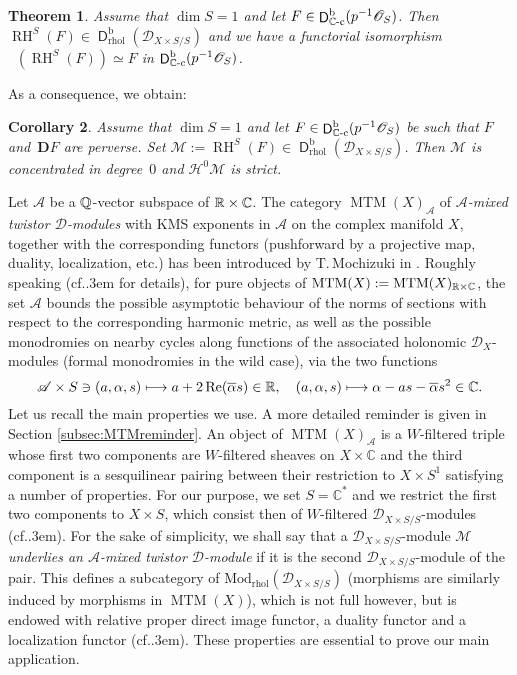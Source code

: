 \documentclass[english]{smfart}
\numberwithin{subsection}{section}
\def\sha{\mathcal{A}}\let\cA\sha
\def\shd{\mathcal{D}}\let\cD\shd
\def\shh{\mathcal{H}}
\def\shh{\mathcal{H}}
\def\shm{\mathcal{M}}
\def\sho{\mathcal{O}}\let\cO\sho
\newcommand{\C}{\mathbb{C}}\let\CC\C
\newcommand{\bD}{\boldsymbol{D}}
\DeclareMathOperator{\RH}{RH}
\newcommand{\rb}{\mathrm{b}}
\newcommand{\rhol}{\mathrm{rhol}}
\newcommand{\Mod}{\mathrm{Mod}}
\newcommand{\cc}{{\C\textup{-c}}}
\newcommand{\XS}{X\times S}
\newcommand{\DXS}{\shd_{\XS/S}}
\DeclareMathOperator{\rD}{\mathsf{D}}
\DeclareMathOperator{\MTM}{MTM}
\DeclareMathOperator{\reel}{Re}
\DeclareMathOperator{\pSol}{{}^\mathrm{p}Sol}
\let\ov\overline
\def\cf{cf.\kern.3em}
\newcommand{\pOS}{p^{-1}\sho_S}
\numberwithin{equation}{section}
\theoremstyle{plain}
\newtheorem{theoremintro}{Theorem}
\newtheorem{corollaryintro}[theoremintro]{Corollary}
\theoremstyle{definition}
\def\mto{\mathchoice{\longmapsto}{\mapsto}{\mapsto}{\mapsto}}
\begin{document}
\begin{theoremintro}\label{T:11}
Assume that $\dim S=1$ and let $F\in\rD^\rb_\cc(\pOS)$. Then $\RH^S(F)\in \rD^\rb_\rhol(\DXS)$ and we have a functorial isomorphism $\pSol(\RH^S(F))\simeq F$ in $\rD^\rb_\cc(\pOS)$.
\end{theoremintro}

As a consequence, we obtain:

\begin{corollaryintro} \label{P:fin1}
Assume that $\dim S=1$ and let $F\in\rD^\rb_\cc(\pOS)$ be such that $F$ and~$\bD F$ are perverse. Set $\shm:=\RH^S(F)\in\rD^\rb_{\rhol}(\DXS)$. Then $\shm$ is concentrated in degree~$0$ and $\shh^0\shm$ is strict.
\end{corollaryintro}

Let $\sha$ be a $\mathbb{Q}$-vector subspace of $\RR\times\CC$. The category $\MTM(X)_\sha$ of \emph{$\sha$-mixed twistor $\cD$\nobreakdash-modules} with KMS exponents in $\sha$ on the complex manifold $X$, together with the corresponding functors (pushforward by a projective map, duality, localization, etc.) has been introduced by T.\,Mochizuki in \cite{Mochizuki11}. Roughly speaking  (\cf\cite[\S7.1.3]{Mochizuki11} for details), for pure objects of $\MTM(X):=\MTM(X)_{\RR\times\CC}$, the set $\sha$ bounds the possible asymptotic behaviour of the norms of sections with respect to the corresponding harmonic metric, as well as the possible monodromies on nearby cycles along functions of the associated holonomic $\cD_X$\nobreakdash-modules (formal monodromies in the wild case), via the two functions
\[
\sha\times S\ni(a,\alpha,s)\mto a+2\reel(\ov\alpha s)\in\RR,\quad (a,\alpha,s)\mto\alpha-as-\ov\alpha s^2\in\CC.
\]
Let us recall the main properties we use. A more detailed reminder is given in Section \ref{subsec:MTMreminder}. An object of $\MTM(X)_\sha$ is a $W$-filtered triple whose first two components are $W$-filtered sheaves on $X\times\CC$ and the third component is a sesquilinear pairing between their restriction to $X\times S^1$ satisfying a number of properties. For our purpose, we set $S=\CC^*$ and we restrict the first two components to $\XS$, which consist then of $W$-filtered $\DXS$\nobreakdash-modules (\cf \cite{Bibi01c,Mochizuki07,Mochizuki11}). For the sake of simplicity, we shall say that a $\DXS$-module \emph{$\shm$ underlies an $\sha$-mixed twistor $\cD$-module} if it is the second $\DXS$-module of the pair. This defines a subcategory of $\Mod_\rhol(\DXS)$ (morphisms are similarly induced by morphisms in $\MTM(X)$), which is not full however, but is endowed with relative proper direct image functor, a duality functor and a localization functor (\cf \cite{Mochizuki11}). These properties are essential to prove our main application.
\end{document}
